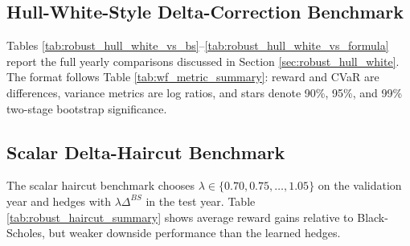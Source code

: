 \documentclass[a4paper,12pt]{article}
\numberwithin{equation}{section}
\begin{document}
\subsection{Hull-White-Style Delta-Correction Benchmark}
\label{sec:appendix_hull_white}

Tables \ref{tab:robust_hull_white_vs_bs}--\ref{tab:robust_hull_white_vs_formula} report the full yearly comparisons discussed in Section \ref{sec:robust_hull_white}. The format follows Table \ref{tab:wf_metric_summary}: reward and CVaR are differences, variance metrics are log ratios, and stars denote 90\%, 95\%, and 99\% two-stage bootstrap significance.

\begin{table}[H]
    \centering
    \caption{Hull-White-style benchmark relative to Black-Scholes.}
    \label{tab:robust_hull_white_vs_bs}
    \small
    
\end{table}

\begin{table}[H]
    \centering
    \caption{Hull-White-style benchmark relative to the neural agent.}
    \label{tab:robust_hull_white_vs_agent}
    \small
    
\end{table}

\begin{table}[H]
    \centering
    \caption{Hull-White-style benchmark relative to the selected symbolic formula.}
    \label{tab:robust_hull_white_vs_formula}
    \small
    
\end{table}

\subsection{Scalar Delta-Haircut Benchmark}
\label{sec:appendix_haircut}

The scalar haircut benchmark chooses $\lambda\in\{0.70,0.75,\ldots,1.05\}$ on the validation year and hedges with $\lambda\Delta^{BS}$ in the test year. Table \ref{tab:robust_haircut_summary} shows average reward gains relative to Black-Scholes, but weaker downside performance than the learned hedges.

\begin{table}[H]
    \centering
    \caption{Scalar delta-haircut benchmark. Entries follow the format of Table \ref{tab:robust_hull_white_summary}.}
    \label{tab:robust_haircut_summary}
    \small
    
\end{table}
\end{document}
